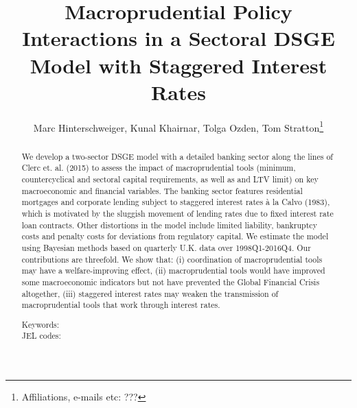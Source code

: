 \documentclass[12pt]{article}
\title{Macroprudential Policy Interactions in a Sectoral DSGE Model with Staggered Interest Rates}
\author{Marc Hinterschweiger, Kunal Khairnar, Tolga Ozden, Tom Stratton\footnote{Affiliations, e-mails etc: ???}}
\numberwithin{equation}{section}
\begin{document}
\maketitle



\begin{abstract}

We develop a two-sector DSGE model with a detailed banking sector along the lines of Clerc et. al. (2015) to assess the impact of macroprudential tools (minimum, countercyclical and sectoral capital requirements, as well as and LTV limit) on key macroeconomic and financial variables. The banking sector features residential mortgages and corporate lending subject to staggered interest rates à la Calvo (1983), which is motivated by the sluggish movement of lending rates due to fixed interest rate loan contracts. Other distortions in the model include limited liability, bankruptcy costs and penalty costs for deviations from regulatory capital. We estimate the model using Bayesian methods based on quarterly U.K. data over 1998Q1-2016Q4. Our contributions are threefold. We show that: (i) coordination of macroprudential tools may have a welfare-improving effect, (ii) macroprudential tools would have improved some macroeconomic indicators but not have prevented the Global Financial Crisis altogether, (iii) staggered interest rates may weaken the transmission of macroprudential tools that work through interest rates. 

\noindent
Keywords:\\
\noindent 
JEL codes: 


	
\end{abstract}
\noindent
\end{document}
